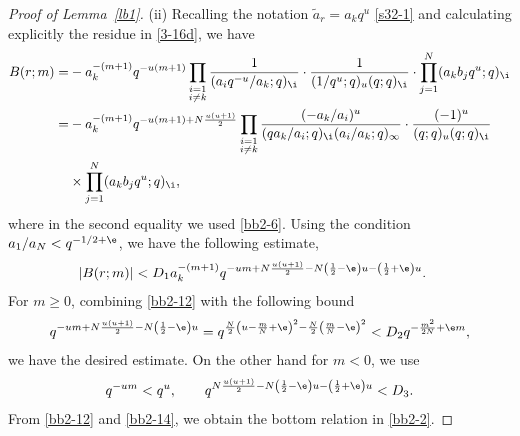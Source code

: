 \begin{proof}[Proof of Lemma~\ref{lb1}]
 (ii)
 Recalling the notation $\tilde{a}_r=a_k q^{u}$ \eqref{s32-1} and calculating explicitly the residue in \eqref{3-16d}, we have
 \begin{align*}
 B(r;m)=&-a_k^{-(m+1)}q^{-u(m+1)}
 \prod_{\substack{i=1\\ i\neq k}}
 \frac{1}{(a_iq^{-u}/a_k ;q)_{\i}}\cdot
 \frac{1}{(1/q^u;q)_u (q;q)_{\i}}\cdot
 \prod_{j=1}^N(a_kb_jq^{u};q)_{\i}
 \\
 =&
 -a_k^{-(m+1)}q^{-u (m+1)+N\frac{u(u+1)}{2}}
 \prod_{\substack{i=1\\ i\neq k}}
 \frac{(-a_k/a_i)^u}{(q a_k/a_i;q)_{\i}(a_i/a_k;q)_\infty}\cdot
 \frac{(-1)^u}{(q;q)_u (q;q)_{\i}}
 \\
 &\times\prod_{j=1}^N(a_k b_jq^{u};q)_{\i},
 \end{align*}
 where in the second equality we used \eqref{bb2-6}.
 Using the condition $a_1/a_N< q^{-1/2+\e}$, we have the following estimate,
 \begin{align}
 \label{bb2-12}
 |B(r;m)|&<D_1 a_k^{-(m+1)} q^{-u m +N\frac{u(u+1)}{2}-N\left(\frac12-\e\right)u -\left(\frac12+\e\right)u}.
 \end{align}
 For $m\ge 0$, combining \eqref{bb2-12} with
 the following bound
 \begin{align*}
 q^{-u m+N\frac{u(u+1)}{2}-N\left(\frac12-\e\right)u}
 =
 q^{\frac{N}{2}\left(u-\frac{m}{N}+\e\right)^2-\frac{N}{2}\left(\frac{m}{N}-\e\right)^2}
 <D_2
 q^{-\frac{m^2}{2N}+\e m},
 \end{align*}
 we have the desired estimate. On the other hand
 for $m<0$, we use
 \begin{align}
 \label{bb2-14}
 q^{-u m}<q^{u},
 \qquad
 q^{N\frac{u(u+1)}{2}-N\left(\frac12-\e\right)u -\left(\frac12+\e\right)u}<D_3.
 \end{align}
 From \eqref{bb2-12} and \eqref{bb2-14}, we obtain
 the bottom relation in \eqref{bb2-2}.
\end{proof}



